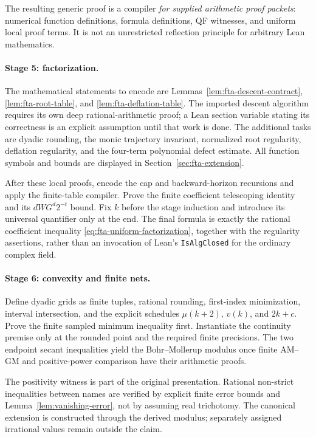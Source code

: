 The resulting generic proof is a compiler \emph{for supplied arithmetic
proof packets}: numerical function definitions, formula definitions,
QF witnesses, and uniform local proof terms. It is not an unrestricted
reflection principle for arbitrary Lean mathematics.

\paragraph{Stage 5: factorization.}
The mathematical statements to encode are
Lemmas~\ref{lem:fta-descent-contract}, \ref{lem:fta-root-table}, and
\ref{lem:fta-deflation-table}. The imported descent algorithm requires
its own deep rational-arithmetic proof; a Lean section variable stating
its correctness is an explicit assumption until that work is done.
The additional tasks are dyadic rounding, the monic trajectory
invariant, normalized root regularity, deflation regularity, and the
four-term polynomial defect estimate. All function symbols and bounds
are displayed in Section~\ref{sec:fta-extension}.

After these local proofs, encode the cap and backward-horizon
recursions and apply the finite-table compiler. Prove the finite
coefficient telescoping identity and its $dWG^d2^{-t}$ bound. Fix $k$
before the stage induction and introduce its universal quantifier only
at the end. The final formula is exactly the rational coefficient
inequality \eqref{eq:fta-uniform-factorization}, together with the
regularity assertions, rather than an invocation of Lean's
\texttt{IsAlgClosed} for the ordinary complex field.

\paragraph{Stage 6: convexity and finite nets.}
Define dyadic grids as finite tuples, rational rounding, first-index
minimization, interval intersection, and the explicit schedules
$\mu(k+2)$, $v(k)$, and $2k+c$. Prove the finite sampled minimum
inequality first. Instantiate the continuity premise only at the rounded
point and the required finite precisions. The two endpoint secant
inequalities yield the Bohr--Mollerup modulus once finite AM--GM and
positive-power comparison have their arithmetic proofs.

The positivity witness is part of the original presentation. Rational
non-strict inequalities between names are verified by explicit finite
error bounds and Lemma~\ref{lem:vanishing-error}, not by assuming real
trichotomy. The canonical extension is constructed through the derived
modulus; separately assigned irrational values remain outside the claim.

